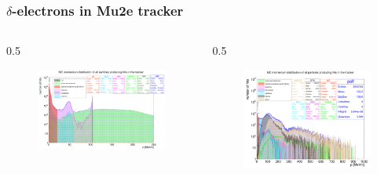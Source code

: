 \documentclass{beamer}
\begin{document}
\begin{frame}
\frametitle{$\delta$-electrons in Mu2e tracker}
\vspace{-8mm}
    \begin{columns}
        \begin{column}{0.5\framewidth}
            \begin{figure}[!h]
        \centering
        \hspace*{-1em}
        \includegraphics[width =1.1\columnwidth]{figures/png/Screenshot_20240812_152905.png}
       \label{fig:momhits}
\end{figure}
        \end{column}
        \begin{column}{0.5\framewidth}
               \begin{figure}[!h]
        \centering
         \hspace*{-1em}
        \includegraphics[width =0.95\columnwidth]{figures/png/Screenshot_20240815_124710.png}

\end{figure}
\end{column}
\end{columns}
\end{frame}
\end{document}
